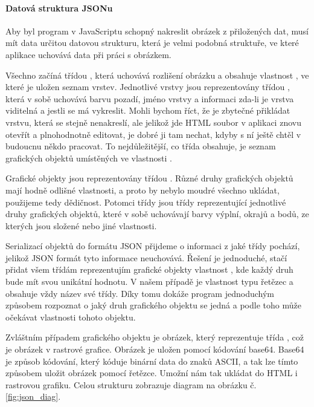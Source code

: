 \documentclass[
  field=inf,
  biblatex=false,
  glossaries,
  index
]{kidiplom}
\begin{document}
\paragraph{Datová struktura JSONu}
Aby byl program v JavaScriptu schopný nakreslit obrázek z přiložených dat, musí mít data určitou datovou strukturu, která je velmi podobná struktuře, ve které aplikace uchovává data při práci s obrázkem.

Všechno začíná třídou , která uchovává rozlišení obrázku a obsahuje vlastnost , ve které je uložen seznam vrstev. Jednotlivé vrstvy jsou reprezentovány třídou , která v sobě uchovává barvu pozadí, jméno vrstvy a informaci zda-li je vrstva viditelná a jestli se má vykreslit. Mohli bychom říct, že je zbytečné přikládat vrstvu, která se stejně nenakreslí, ale jelikož jde HTML soubor v aplikaci znovu otevřít a plnohodnotně editovat, je dobré ji tam nechat, kdyby s ní ještě chtěl v budoucnu někdo pracovat. To nejdůležitější, co třída  obsahuje, je seznam grafických objektů umístěných ve vlastnosti .

Grafické objekty jsou reprezentovány třídou . Různé druhy grafických objektů mají hodně odlišné vlastnosti, a proto by nebylo moudré všechno ukládat, použijeme tedy dědičnost. Potomci třídy  jsou třídy reprezentující jednotlivé druhy grafických objektů, které v sobě uchovávají barvy výplní, okrajů a bodů, ze kterých jsou složené nebo jiné vlastnosti.

Serializací objektů do formátu JSON přijdeme o informaci z jaké třídy pochází, jelikož JSON formát tyto informace neuchovává. Řešení je jednoduché, stačí přidat všem třídám reprezentujím grafické objekty vlastnost , kde každý druh bude mít svou unikátní hodnotu. V našem případě je vlastnost  typu řetězec a obsahuje vždy název své třídy. Díky tomu dokáže program jednoduchým způsobem rozpoznat o jaký druh grafického objektu se jedná a podle toho může očekávat vlastnosti tohoto objektu.

Zvláštním případem grafického objektu je obrázek, který reprezentuje třída , což je obrázek v rastrové grafice. Obrázek je uložen pomocí kódování base64. Base64 je způsob kódování, který kóduje binární data do znaků ASCII, a tak lze tímto způsobem uložit obrázek pomocí řetězce. Umožní nám tak ukládat do HTML i rastrovou grafiku. Celou strukturu zobrazuje diagram na obrázku č. \ref{fig:json_diag}.
\end{document}
